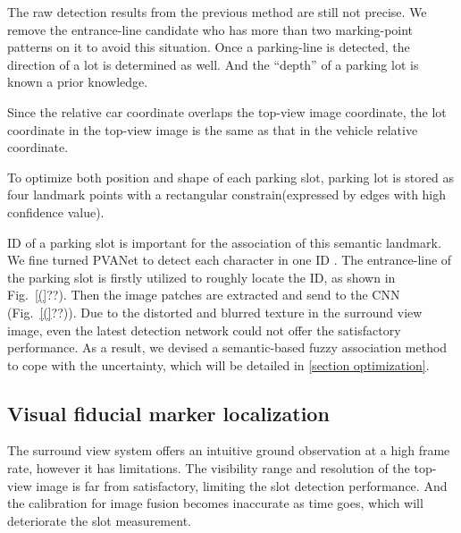 \documentclass[journal]{IEEEtran}
\newcommand{\Reffig}[1]{Fig.~\ref{#1}}
\begin{document}
The raw detection results from the previous method are still not precise. 
We remove the entrance-line candidate who has more than two marking-point patterns on it to avoid this situation.  
Once a parking-line is detected, the direction of a lot is determined as well. And the “depth” of a parking lot is known a prior knowledge. 
	
Since the relative car coordinate overlaps the top-view image coordinate, the lot coordinate in the top-view image is the same as that in the vehicle relative coordinate. 

To optimize both position and shape of each parking slot, parking lot is stored as four landmark points with a rectangular constrain(expressed by edges with high confidence value).


ID of a parking slot is important for the association of this semantic landmark.
We fine turned PVANet to detect each character in one ID \citep{Hong2016PVANet}.
The entrance-line of the parking slot is firstly utilized to roughly locate the ID, as shown in \Reffig(??).
Then the image patches are extracted and send to the CNN (\Reffig(??)).
Due to the distorted and blurred texture in the surround view image, even the latest detection network could not offer the satisfactory performance.
As a result, we devised a semantic-based fuzzy association method to cope with the uncertainty, which will be detailed in \ref{section optimization}.  





\subsection{Visual fiducial marker localization}

The surround view system offers an intuitive ground observation at a high frame rate, however it has limitations. 
The visibility range and resolution of the top-view image is far from satisfactory, limiting the slot detection performance. 
And the calibration for image fusion becomes inaccurate as time goes, which will deteriorate the slot measurement.
\end{document}
